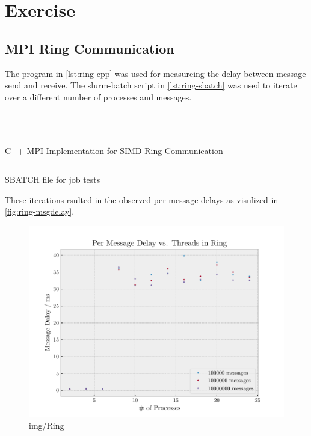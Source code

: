 \documentclass[]{scrartcl}
\newcommand{\exercise}{Exercise \thesection}
\begin{document}
\section*{\exercise}

\subsection{MPI Ring Communication}
The program in \autoref{lst:ring-cpp} was used for measureing the delay between message send and receive. The slurm-batch script in \autoref{lst:ring-sbatch} was used to iterate over a different number of processes and messages.

\begin{listing}[H]
    \inputminted[firstline=8, lastline=8]{cpp}{src/ring.cpp}
    \inputminted[firstline=20, lastline=21]{cpp}{src/ring.cpp}
    \inputminted[firstline=25, lastline=34]{cpp}{src/ring.cpp}
    \inputminted[firstline=44, lastline=47]{cpp}{src/ring.cpp}
    \caption{C++ MPI Implementation for SIMD Ring Communication}%
    \label{lst:ring-cpp}
\end{listing}


\begin{listing}[H]
    \inputminted[]{bash}{slurm_ring.sh}
    \caption{SBATCH file for job tests}%
    \label{lst:ring-sbatch}
\end{listing}

These iterations rsulted in the observed per message delays as visulized in \autoref{fig:ring-msgdelay}.

\begin{figure}[ht]
    \centering
    \includegraphics[width=\linewidth]{img/ring.pdf}
    \caption{img/Ring}%
    \label{fig:ring-msgdelay}
\end{figure}
\end{document}
